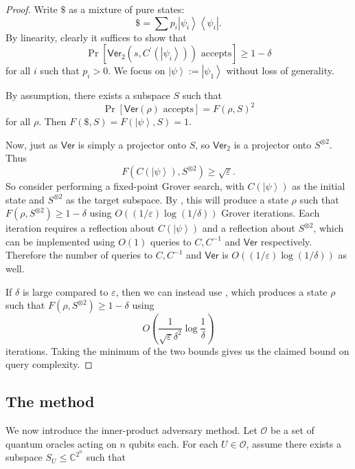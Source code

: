 \begin{proof}
Write $\$$ as a mixture of pure states:%
\[
\$=\sum p_{i}\left\vert \psi_{i}\right\rangle \left\langle \psi_{i}\right\vert
.
\]
By linearity, clearly it suffices to show that%
\[
\Pr\left[  \mathsf{Ver}_{2}\left(  s,C^{\prime}\left(  \left\vert \psi
_{i}\right\rangle \right)  \right)  \text{ accepts}\right]  \geq1-\delta
\]
for all $i$ such that $p_{i}>0$. We focus on $\left\vert \psi\right\rangle
:=\left\vert \psi_{1}\right\rangle $ without loss of generality.

By assumption, there exists a subspace $S$ such that%
\[
\Pr\left[  \mathsf{Ver}\left(  \rho\right)  \text{ accepts}\right]  =F\left(
\rho,S\right)  ^{2}%
\]
for all $\rho$. Then $F\left(  \$,S\right)  =F\left(  \left\vert
\psi\right\rangle ,S\right)  =1$.

Now, just as $\mathsf{Ver}$ is simply a projector onto $S$, so $\mathsf{Ver}%
_{2}$ is a projector onto $S^{\otimes2}$. Thus%
\[
F\left(  C\left(  \left\vert \psi\right\rangle \right)  ,S^{\otimes2}\right)
\geq\sqrt{\varepsilon}.
\]
So consider performing a fixed-point Grover search, with $C\left(  \left\vert
\psi\right\rangle \right)  $ as the initial state and $S^{\otimes2}$ as the
target subspace. By , this will produce a state $\rho
$ such that $F\left(  \rho,S^{\otimes2}\right)  \geq1-\delta$ using
$O\left(({1}/{\varepsilon}) \log ({1}/{\delta})\right)  $ Grover
iterations. Each iteration requires a reflection about $C\left(  \left\vert
\psi\right\rangle \right)  $ and a reflection about $S^{\otimes2}$, which can
be implemented using $O\left(  1\right)  $ queries to $C,C^{-1}$ and
$\mathsf{Ver}$ respectively. Therefore the number of queries to $C,C^{-1}$
and $\mathsf{Ver}$ is $O\left(({1}/{\varepsilon}) \log ({1}/{\delta
})\right)$ as well.

If $\delta$ is large compared to $\varepsilon$, then we can instead use
, which produces a state $\rho$ such that $F\left(
\rho,S^{\otimes2}\right)  \geq1-\delta$ using 
\[
O\left(  \frac{1}
{\sqrt{\varepsilon}\delta^{2}}\log\frac{1}{\delta}\right)
\]
iterations.
Taking the minimum of the two bounds gives us the claimed bound on query complexity.
\end{proof}

\subsection{The method\label{THEMETHOD}}

We now introduce the inner-product adversary method. Let $\mathcal{O}$ be a
set of quantum oracles acting on $n$ qubits each. For each $U\in\mathcal{O}%
$, assume there exists a subspace $S_{U}\leq\mathbb{C}^{2^{n}}$ such that

